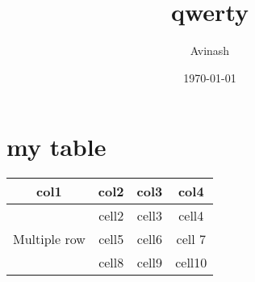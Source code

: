 \documentclass{article}
\title{qwerty}
\author{Avinash}
\date{\today}
\begin{document}
\maketitle

\section*{my table}
\begin{center}

\begin{tabular}{ |c|c|c|c| }
\hline
col1 & col2 & col3 & col4 \\
\hline
\multirow{3}{4em}{Multiple row} & cell2 & cell3 & cell4 \\ 
& cell5 & cell6 & cell 7\\ 
& cell8 & cell9 & cell10 \\ 
\hline
\end{tabular}

\end{center}
\end{document}
